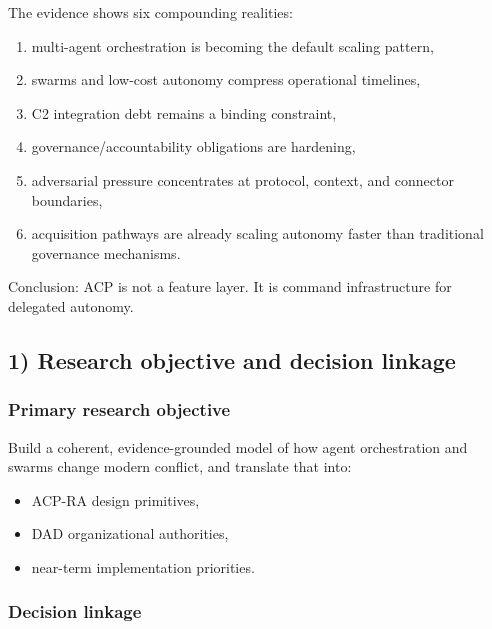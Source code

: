 \documentclass[11pt]{article}
\begin{document}
The evidence shows six compounding realities:

\begin{enumerate}
\def\labelenumi{\arabic{enumi}.}
\tightlist
\item
  multi-agent orchestration is becoming the default scaling pattern,
\item
  swarms and low-cost autonomy compress operational timelines,
\item
  C2 integration debt remains a binding constraint,
\item
  governance/accountability obligations are hardening,
\item
  adversarial pressure concentrates at protocol, context, and connector
  boundaries,
\item
  acquisition pathways are already scaling autonomy faster than
  traditional governance mechanisms.
\end{enumerate}

Conclusion: ACP is not a feature layer. It is command infrastructure for
delegated autonomy.

\hypertarget{research-objective-and-decision-linkage}{%
\subsection{1) Research objective and decision
linkage}\label{research-objective-and-decision-linkage}}

\hypertarget{primary-research-objective}{%
\subsubsection{Primary research
objective}\label{primary-research-objective}}

Build a coherent, evidence-grounded model of how agent orchestration and
swarms change modern conflict, and translate that into:

\begin{itemize}
\tightlist
\item
  ACP-RA design primitives,
\item
  DAD organizational authorities,
\item
  near-term implementation priorities.
\end{itemize}

\hypertarget{decision-linkage}{%
\subsubsection{Decision linkage}\label{decision-linkage}}
\end{document}
